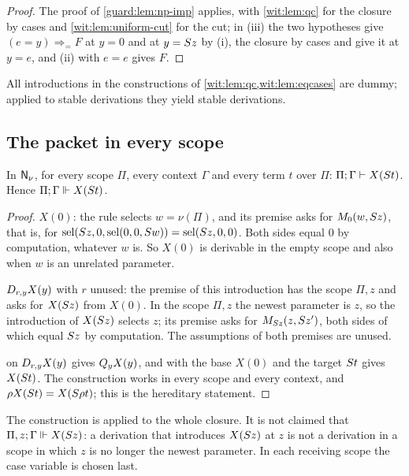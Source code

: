 \begin{proof}
The proof of \cref{guard:lem:np-imp} applies, with \cref{wit:lem:qc} for
the closure by cases and \cref{wit:lem:uniform-cut} for the cut; in (iii)
the two hypotheses give $(e=y)\Rightarrow_{=}F$ at $y=0$ and at
$y=S z$ by (i), the closure by cases and  give it at $y=e$,
and (ii) with $e=e$ gives $F$.
\end{proof}

All introductions in the constructions of
\cref{wit:lem:qc,wit:lem:eqcases} are dummy; applied to stable derivations
they yield stable derivations.

\subsection{The packet in every scope}

\begin{lemma}
\label{wit:lem:packet}
In $\mathsf{N}_{\nu}$, for every scope $\Pi$, every context $\Gamma$ and every
term $t$ over $\Pi$: $\Pi;\Gamma\vdash X(S t)$.  Hence
$\Pi;\Gamma\Vdash X(S t)$.
\end{lemma}

\begin{proof}
$X(0)$: the rule selects $w=\nu(\Pi)$, and its premise asks for
$M_0(w,S z)$, that is, for
$\operatorname{sel}(S z,0,\operatorname{sel}(0,0,S w))=\operatorname{sel}(S z,0,0)$.  Both sides equal $0$ by
computation, whatever $w$ is.  So $X(0)$ is derivable in the empty scope and
also when $w$ is an unrelated parameter.

$D_{r,y}X(y)$ with $r$ unused: the premise of this introduction has the
scope $\Pi,z$ and asks for $X(S z)$ from $X(0)$.  In the scope $\Pi,z$
the newest parameter is $z$, so the introduction of $X(S z)$ selects $z$;
its premise asks for $M_{S z}(z,S z')$, both sides of which equal
$S z$ by computation.  The assumptions of both premises are unused.

 on $D_{r,y}X(y)$ gives $Q_{y}X(y)$, and  with
the base $X(0)$ and the target $S t$ gives $X(S t)$.  The construction
works in every scope and every context, and
$\rho X(S t)=X(S\rho t)$; this is the hereditary statement.
\end{proof}

The construction is applied to the whole closure.  It is not claimed that
$\Pi,z;\Gamma\Vdash X(S z)$: a derivation that introduces $X(S z)$ at
$z$ is not a derivation in a scope in which $z$ is no longer the newest
parameter.  In each receiving scope the case variable is chosen last.

